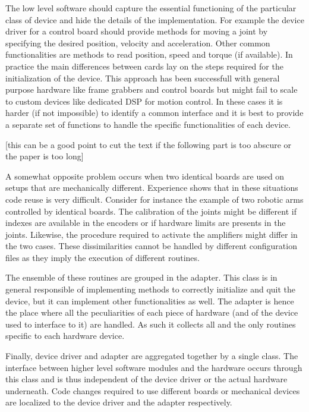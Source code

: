 The low level software should capture the essential functioning of the
particular class of device and hide the details of the
implementation. For example the device driver for a control board
should provide methods for moving a joint by specifying the desired
position, velocity and acceleration. Other common functionalities are
methods to read position, speed and torque (if available). In practice
the main differences between cards lay on the steps required for the
initialization of the device. This approach has been successfull with
general purpose hardware like frame grabbers and control boards but
might fail to scale to custom devices like dedicated DSP for motion
control. In these cases it is harder (if not impossible) to identify a
common interface and it is best to provide a separate set of functions
to handle the specific functionalities of each device.

[this can be a good point to cut the text if the following part is too abscure or the paper is too long]

A somewhat opposite problem occurs when two identical boards are used
on setups that are mechanically different. Experience shows that in
these situations code reuse is very difficult. Consider for instance
the example of two robotic arms controlled by identical boards. The
calibration of the joints might be different if indexes are available
in the encoders or if hardware limits are presents in the
joints. Likewise, the procedure required to activate the amplifiers
might differ in the two cases. These dissimilarities cannot be handled
by different configuration files as they imply the execution of
different routines.

The ensemble of these routines are grouped in the adapter. This class
is in general responsible of implementing methods to correctly
initialize and quit the device, but it can implement other
functionalities as well. The adapter is hence the place where all the
peculiarities of each piece of hardware (and of the device used to
interface to it) are handled. As such it collects all and the only
routines specific to each hardware device.

Finally, device driver and adapter are aggregated together by a single
class. The interface between higher level software modules and the
hardware occurs through this class and is thus independent of the
device driver or the actual hardware underneath. Code changes required
to use different boards or mechanical devices are localized to the
device driver and the adapter respectively.

